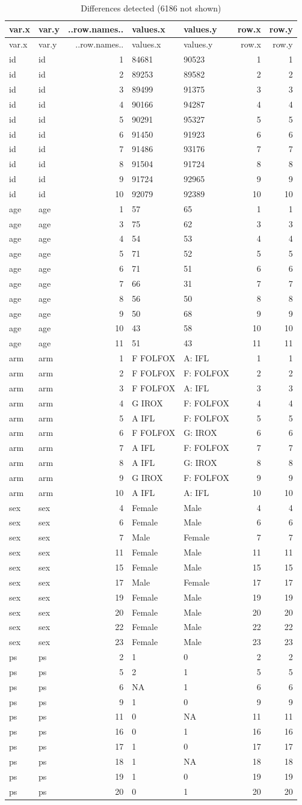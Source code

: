 \documentclass[
]{book}
\begin{document}
\begin{longtable}[]{@{}llrllrr@{}}
\caption{\label{tab:unnamed-chunk-28}Differences detected (6186 not shown)}\tabularnewline
\toprule
var.x & var.y & ..row.names.. & values.x & values.y & row.x & row.y\tabularnewline
\midrule
\endfirsthead
\toprule
var.x & var.y & ..row.names.. & values.x & values.y & row.x & row.y\tabularnewline
\midrule
\endhead
id & id & 1 & 84681 & 90523 & 1 & 1\tabularnewline
id & id & 2 & 89253 & 89582 & 2 & 2\tabularnewline
id & id & 3 & 89499 & 91375 & 3 & 3\tabularnewline
id & id & 4 & 90166 & 94287 & 4 & 4\tabularnewline
id & id & 5 & 90291 & 95327 & 5 & 5\tabularnewline
id & id & 6 & 91450 & 91923 & 6 & 6\tabularnewline
id & id & 7 & 91486 & 93176 & 7 & 7\tabularnewline
id & id & 8 & 91504 & 91724 & 8 & 8\tabularnewline
id & id & 9 & 91724 & 92965 & 9 & 9\tabularnewline
id & id & 10 & 92079 & 92389 & 10 & 10\tabularnewline
age & age & 1 & 57 & 65 & 1 & 1\tabularnewline
age & age & 3 & 75 & 62 & 3 & 3\tabularnewline
age & age & 4 & 54 & 53 & 4 & 4\tabularnewline
age & age & 5 & 71 & 52 & 5 & 5\tabularnewline
age & age & 6 & 71 & 51 & 6 & 6\tabularnewline
age & age & 7 & 66 & 31 & 7 & 7\tabularnewline
age & age & 8 & 56 & 50 & 8 & 8\tabularnewline
age & age & 9 & 50 & 68 & 9 & 9\tabularnewline
age & age & 10 & 43 & 58 & 10 & 10\tabularnewline
age & age & 11 & 51 & 43 & 11 & 11\tabularnewline
arm & arm & 1 & F FOLFOX & A: IFL & 1 & 1\tabularnewline
arm & arm & 2 & F FOLFOX & F: FOLFOX & 2 & 2\tabularnewline
arm & arm & 3 & F FOLFOX & A: IFL & 3 & 3\tabularnewline
arm & arm & 4 & G IROX & F: FOLFOX & 4 & 4\tabularnewline
arm & arm & 5 & A IFL & F: FOLFOX & 5 & 5\tabularnewline
arm & arm & 6 & F FOLFOX & G: IROX & 6 & 6\tabularnewline
arm & arm & 7 & A IFL & F: FOLFOX & 7 & 7\tabularnewline
arm & arm & 8 & A IFL & G: IROX & 8 & 8\tabularnewline
arm & arm & 9 & G IROX & F: FOLFOX & 9 & 9\tabularnewline
arm & arm & 10 & A IFL & A: IFL & 10 & 10\tabularnewline
sex & sex & 4 & Female & Male & 4 & 4\tabularnewline
sex & sex & 6 & Female & Male & 6 & 6\tabularnewline
sex & sex & 7 & Male & Female & 7 & 7\tabularnewline
sex & sex & 11 & Female & Male & 11 & 11\tabularnewline
sex & sex & 15 & Female & Male & 15 & 15\tabularnewline
sex & sex & 17 & Male & Female & 17 & 17\tabularnewline
sex & sex & 19 & Female & Male & 19 & 19\tabularnewline
sex & sex & 20 & Female & Male & 20 & 20\tabularnewline
sex & sex & 22 & Female & Male & 22 & 22\tabularnewline
sex & sex & 23 & Female & Male & 23 & 23\tabularnewline
ps & ps & 2 & 1 & 0 & 2 & 2\tabularnewline
ps & ps & 5 & 2 & 1 & 5 & 5\tabularnewline
ps & ps & 6 & NA & 1 & 6 & 6\tabularnewline
ps & ps & 9 & 1 & 0 & 9 & 9\tabularnewline
ps & ps & 11 & 0 & NA & 11 & 11\tabularnewline
ps & ps & 16 & 0 & 1 & 16 & 16\tabularnewline
ps & ps & 17 & 1 & 0 & 17 & 17\tabularnewline
ps & ps & 18 & 1 & NA & 18 & 18\tabularnewline
ps & ps & 19 & 1 & 0 & 19 & 19\tabularnewline
ps & ps & 20 & 0 & 1 & 20 & 20\tabularnewline
\bottomrule
\end{longtable}
\end{document}
